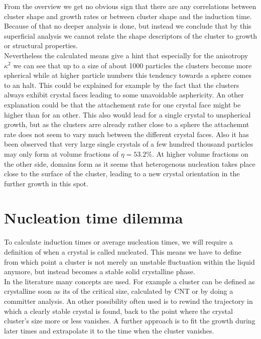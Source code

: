 From the overview we get no obvious sign that there are any correlations between cluster shape and growth rates or between cluster shape and the induction time. Because of that no deeper analysis is done, but instead we conclude that by this superficial analysis we cannot relate the shape descriptors of the cluster to growth or structural properties.\\

Nevertheless the calculated means give a hint that especially for the anisotropy $\kappa^2$ we can see that up to a size of about 1000 particles the clusters become more spherical while at higher particle numbers this tendency towards a sphere comes to an halt. This could be explained for example by the fact that the clusters always exhibit crystal faces leading to some unavoidable asphericity. An other explanation could be that the attachement rate for one crystal face might be higher than for an other. This also would lead for a single crystal to unspherical growth, but as the clusters arre already rather close to a sphere the attachemnt rate does not seem to vary much between the different crystal faces. Also it has been observed that very large single crystals of a few hundred thousand particles may only form at volume fractions of $\eta = 53.2 \%$. At higher volume fractions on the other side, domains form as it seems that heterogenous nucleation takes place close to the surface of the cluster, leading to a new crystal orientation in the further growth in this spot.\\


\section{Nucleation time dilemma}
\label{sec:nucleation_times}
To calculate induction times or average nucleation times, we will require a definition of when a crystal is called nucleated. This means we have to define from which point a cluster is not merely an unstable fluctuation within the liquid anymore, but instead becomes a stable solid crystalline phase.\\ 
In the literature many concepts are used. For example a cluster can be defined as crystalline soon as its of the critical size, calculated by CNT or by doing a committer analysis. An other possibility often used is to rewind the trajectory in which a clearly stable crystal is found, back to the point where the crystal cluster's size more or less vanishes. A further approach is to fit the growth during later times and extrapolate it to the time when the cluster vanishes.\\

